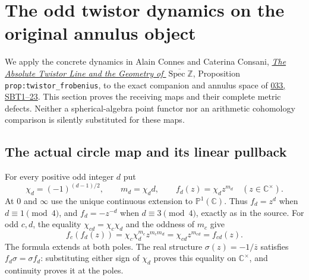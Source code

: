 \section{The odd twistor dynamics on the original annulus object}
\label{sec:twistor-original-boundary}

We apply the concrete dynamics in Alain Connes and Caterina Consani,
\href{https://arxiv.org/abs/2609.00299v1}{\emph{The Absolute Twistor
Line and the Geometry of $\overline{\operatorname{Spec}\mathbb Z}$}},
Proposition \texttt{prop:twistor\_frobenius}, to the exact companion
and annulus space of
\href{https://github.com/KokunoYumeto/zeta-function-research-reader/blob/3c78cfbd9e194d35117b33277c421c6564ce3dbf/workbenches/splitzero-tandem/continuations/20260923-full-prime-support/033/MIXED_PRIME_ENERGY_AND_BOUNDARY.tex}{033,
SBT1--23}. This section proves the receiving maps and their complete
metric defects. Neither a spherical-algebra point functor nor an
arithmetic cohomology comparison is silently substituted for these maps.

\subsection{The actual circle map and its linear pullback}

For every positive odd integer $d$ put
\begin{equation}\tag{TOB1}
 \chi_d=(-1)^{(d-1)/2},\qquad m_d=\chi_d d,\qquad
 f_d(z)=\chi_d z^{m_d}\quad(z\in\mathbb C^\times).
\end{equation}
At $0$ and $\infty$ use the unique continuous extension to
$\mathbb P^1(\mathbb C)$. Thus $f_d=z^d$ when $d\equiv1\pmod4$,
and $f_d=-z^{-d}$ when $d\equiv3\pmod4$, exactly as in the source.
For odd $c,d$, the equality $\chi_{cd}=\chi_c\chi_d$ and the oddness
of $m_c$ give
\[
 f_c(f_d(z))=\chi_c\chi_d^{m_c}z^{m_cm_d}
            =\chi_{cd}z^{m_{cd}}=f_{cd}(z).
\]
The formula extends at both poles. The real structure
$\sigma(z)=-1/\overline z$ satisfies
$f_d\sigma=\sigma f_d$: substituting either sign of $\chi_d$
proves this equality on $\mathbb C^\times$, and continuity proves
it at the poles.

